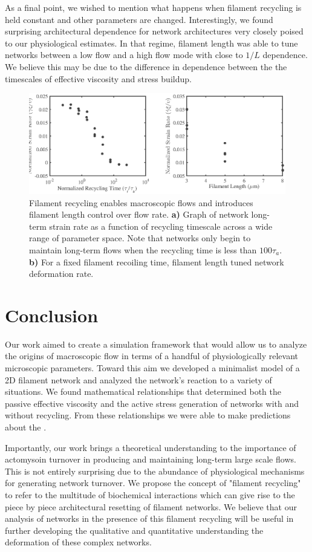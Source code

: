 \documentclass[10pt,letterpaper]{article}
\begin{document}
As a final point, we wished to mention what happens when filament recycling is held constant and other parameters are changed.  Interestingly, we found surprising architectural dependence for network architectures very closely poised to our physiological estimates.  In that regime, filament length was able to tune networks between a low flow and a high flow mode with close to $1/L$ dependence.  We believe this may be due to the difference in dependence between the the timescales of effective viscosity and stress buildup. 
\begin{figure}[h!]
\centering
\includegraphics[width=\hsize]{figures/figure6b}
\caption{\label{fig:flow_form}  Filament recycling enables macroscopic flows and introduces filament length control over flow rate. \textbf{a)}  Graph of network long-term strain rate as a function of recycling timescale across a wide range of parameter space.  Note that networks only begin to maintain long-term flows when the recycling time is less than $100\tau_a$. \textbf{b)} For a fixed filament recoiling time, filament length tuned network deformation rate.}
\end{figure}

\section*{Conclusion}
Our work aimed to create a simulation framework that would allow us to analyze the origins of macroscopic flow in terms of a handful of physiologically relevant microscopic parameters.  Toward this aim we developed a minimalist model of a 2D filament network and analyzed the network's reaction to a variety of situations.  We found mathematical relationships that determined both the passive effective viscosity and the active stress generation of networks with and without recycling.  From these relationships we were able to make predictions about the .  

Importantly, our work brings a theoretical understanding to the importance of actomysoin turnover in producing and maintaining long-term large scale flows.  This is not entirely surprising due to the abundance of physiological mechanisms for generating network turnover.  We propose the concept of "filament recycling" to refer to the multitude of biochemical interactions which can give rise to the piece by piece architectural resetting of filament networks.  We believe that our analysis of networks in the presence of this filament recycling will be useful in further developing the qualitative and quantitative understanding the deformation of these complex networks.
\end{document}
